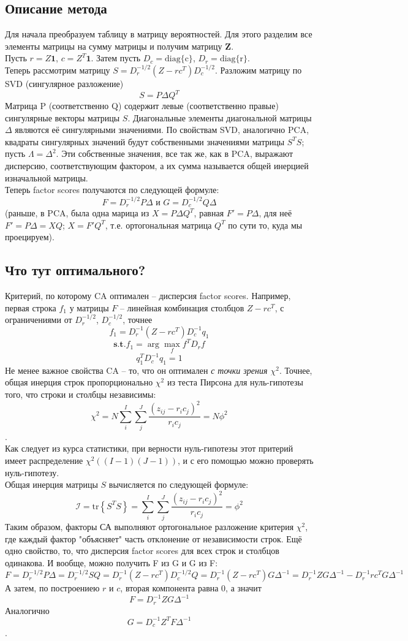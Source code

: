 \subsection{Описание метода}
Для начала преобразуем таблицу в матрицу вероятностей. Для этого разделим все элементы матрицы на сумму матрицы и получим матрицу \textbf{Z}.\\
Пусть $r=Z\textbf{1}$, $c=Z^T\textbf{1}$. Затем пусть $D_c=\text{diag\{c\}}$, $D_r=\text{diag\{r\}}$.\\
Теперь рассмотрим матрицу $S=D_r^{-1/2}(Z-rc^T)D_c^{-1/2}$.
Разложим матрицу по SVD (сингулярное разложение)
$$S=P\Delta Q^T$$
Матрица P (соответственно Q) содержит левые
(соответственно правые) сингулярные векторы матрицы $S$. Диагональные элементы
диагональной матрицы $\Delta$ являются её сингулярными значениями. 
По свойствам SVD, аналогично PCA, квадраты сингулярных значений будут собственными значениями матрицы $S^TS$; пусть $\Lambda=\Delta^2$. Эти собственные значения, все так же, как в PCA, выражают дисперсию, соответствующим фактором, а их сумма называется общей инерцией изначальной матрицы.\\
Теперь factor scores получаются по следующей формуле:
$$F=D_r^{-1/2}P\Delta\text{ и }G=D_c^{-1/2}Q\Delta$$
(раньше, в PCA, была одна марица из $X=P\Delta Q^T$, равная $F'=P\Delta$, для неё $F'=P\Delta=XQ$; $X=F'Q^T$, т.е. ортогональная матрица $Q^T$ по сути то, куда мы проецируем).
\subsection{Что тут оптимального?}
Критерий, по которому CA оптимален -- дисперсия factor scores. Например, первая строка $f_1$ у матрицы $F$ -- линейная комбинация столбцов $Z-rc^T$, с ограничениями от $D_r^{-1/2}$, $D_c^{-1/2}$, точнее $$f_1=D^{-1}_r(Z-rc^T)D^{-1}_cq_1$$$$\textbf{s.t.} f_1=\arg\max\limits_{f}f^TD_rf$$$$ q_1^TD_c^{-1}q_1=1$$  
Не менее важное свойства CA -- то, что он оптимален \textit{с точки зрения $\chi^2$}. Точнее, общая инерция строк пропорционально $\chi^2$ из теста Пирсона для нуль-гипотезы того, что строки и столбцы независимы:
$$\chi^2=N\sum_i^I\sum_j^J\frac{(z_{ij}-r_ic_j)^2}{r_ic_j}=N\phi^2$$.\\
Как следует из курса статистики, при верности нуль-гипотезы этот притерий имеет распределение $\chi^2\left((I-1)(J-1)\right)$, и с его помощью можно проверять нуль-гипотезу.\\
Общая инерция матрицы $S$ вычисляется по следующей формуле:
$$\mathcal{I}=\text{tr}\left\{S^TS\right\}=\sum_i^I\sum_j^J\frac{(z_{ij}-r_ic_j)^2}{r_ic_j}=\phi^2$$
Таким образом, факторы СА выполняют ортогональное разложение критерия $\chi^2$, где каждый фактор "объясняет" часть отклонение от независимости строк.
Ещё одно свойство, то, что дисперсия factor scores для всех строк и столбцов одинакова. И вообще, можно получить F из G и G из F:
$$F=D_r^{-1/2}P\Delta=D_r^{-1/2}SQ=D_r^{-1}(Z-rc^T)D_c^{-1/2}Q=D_r^{-1}(Z-rc^T)G\Delta^{-1}=D_r^{-1}ZG\Delta^{-1}-D_r^{-1}rc^TG\Delta^{-1}$$
А затем, по построениею $r$ и $c$, вторая компонента равна 0, а значит
$$F=D_r^{-1}ZG\Delta^{-1}$$
Аналогично $$G=D_c^{-1}Z^TF\Delta^{-1}$$.
